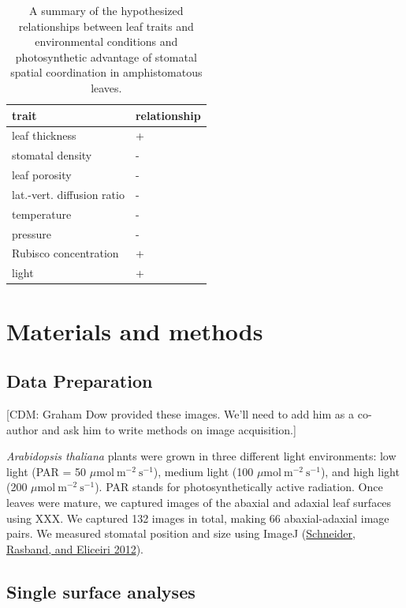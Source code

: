 \documentclass[12pt,halfline,a4paper,]{ouparticle}
\begin{document}
\begin{table}[ht]
\centering
\begin{tabular}{ll}
  \hline
trait & relationship \\ 
  \hline
leaf thickness & + \\ 
  stomatal density & - \\ 
  leaf porosity & - \\ 
  lat.-vert. diffusion ratio & - \\ 
  temperature & - \\ 
  pressure & - \\ 
  Rubisco concentration & + \\ 
  light & + \\ 
   \hline
\end{tabular}
\caption{A summary of the hypothesized relationships between leaf traits and environmental conditions and photosynthetic advantage of stomatal spatial coordination in amphistomatous leaves.} 
\label{tab:hypotheses}
\end{table}

\hypertarget{materials-and-methods}{%
\section{Materials and methods}\label{materials-and-methods}}

\hypertarget{data-preparation}{%
\subsection{Data Preparation}\label{data-preparation}}

{[}CDM: Graham Dow provided these images. We'll need to add him as a
co-author and ask him to write methods on image acquisition.{]}

\emph{Arabidopsis thaliana} plants were grown in three different light
environments: low light (PAR = 50
\(\mu \text{mol}~\text{m}^{-2}~\text{s}^{-1}\)), medium light (100
\(\mu \text{mol}~\text{m}^{-2}~\text{s}^{-1}\)), and high light (200
\(\mu \text{mol}~\text{m}^{-2}~\text{s}^{-1}\)). PAR stands for
photosynthetically active radiation. Once leaves were mature, we
captured images of the abaxial and adaxial leaf surfaces using XXX. We
captured 132 images in total, making 66 abaxial-adaxial image pairs. We
measured stomatal position and size using ImageJ
(\protect\hyperlink{ref-schneider_nih_2012}{Schneider, Rasband, and
Eliceiri 2012}).

\hypertarget{single-surface-analyses}{%
\subsection{Single surface analyses}\label{single-surface-analyses}}
\end{document}
